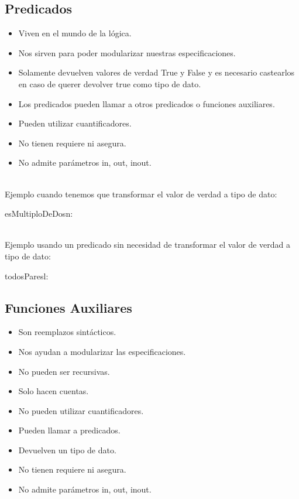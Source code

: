 \documentclass[10pt,a4paper]{article}
\begin{document}
\subsection*{Predicados}
\begin{itemize}
    \item Viven en el mundo de la lógica. 
    \item Nos sirven para poder modularizar nuestras especificaciones. 
    \item Solamente devuelven valores de verdad True y False y es necesario castearlos en caso de querer devolver true como tipo de dato.
    \item Los predicados pueden llamar a otros predicados o funciones auxiliares.
    \item Pueden utilizar cuantificadores.
    \item No tienen requiere ni asegura.
    \item No admite parámetros in, out, inout.
\end{itemize}

\leavevmode
\\
Ejemplo cuando tenemos que transformar el valor de verdad a tipo de dato: 
\leavevmode
\\

\begin{proc}{esMultiploDeDos}{\In n: \ent}{\bool}
    \requiere{\True}
\end{proc}
\leavevmode
\\ 
Ejemplo usando un predicado sin necesidad de transformar el valor de verdad a tipo de dato: 

\leavevmode
{}

\begin{proc}{todosPares}{\In l: \TLista{\ent}}{\bool}
\end{proc}
\newpage
\subsection*{Funciones Auxiliares}
\begin{itemize}
    \item Son reemplazos sintácticos. 
    \item Nos ayudan a modularizar las especificaciones.
    \item No pueden ser recursivas.
    \item Solo hacen cuentas.
    \item No pueden utilizar cuantificadores.
    \item Pueden llamar a predicados.
    \item Devuelven un tipo de dato.
    \item No tienen requiere ni asegura.
    \item No admite parámetros in, out, inout.
\end{itemize}
\end{document}
